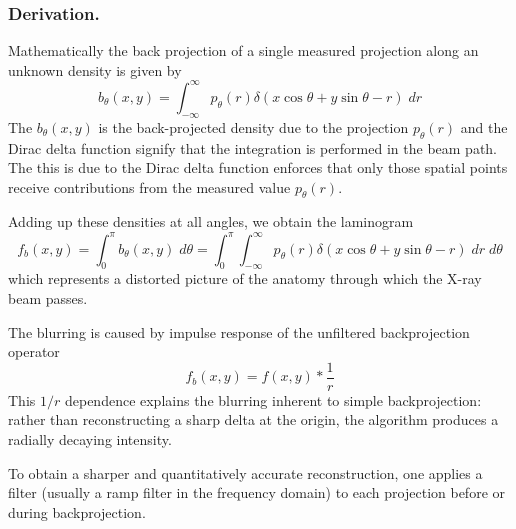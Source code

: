 \documentclass[../../../main.tex]{subfiles}
\begin{document}
\subsubsection{Derivation.}
Mathematically the back projection of a single measured projection along an unknown density is given by
\begin{equation*}
    b_\theta(x,y)=\int_{-\infty}^{\infty} p_\theta(r)\delta(x\cos\theta+y\sin\theta -r)\;dr
\end{equation*}
The $    b_\theta(x,y)$ is the back-projected density due to the projection $p_\theta(r)$ and the  Dirac delta function signify that the integration is performed in the beam path.
The this is due to the Dirac delta function enforces that only those spatial points receive contributions from the measured value $p_\theta(r)$.

Adding up these densities at all angles, we obtain the laminogram
\begin{equation*}
    f_b(x,y)=\int_{0 }^{\pi} b_\theta(x,y)\;d\theta=\int_{0 }^{\pi}\int_{-\infty}^{\infty} p_\theta(r)\delta(x\cos\theta+y\sin\theta -r)\;dr\;d\theta
\end{equation*}
which represents a distorted picture of the anatomy through which the X-ray beam passes.

The blurring is caused by impulse response of the unfiltered backprojection operator
\begin{equation*}
    f_b(x,y)=f(x,y)*\frac{1 }{r}
\end{equation*}
This $1/r$ dependence explains the blurring inherent to simple backprojection: rather than reconstructing a sharp delta at the origin, the algorithm produces a radially decaying intensity.

To obtain a sharper and quantitatively accurate reconstruction, one applies a filter (usually a ramp filter in the frequency domain) to each projection before or during backprojection.
\end{document}
